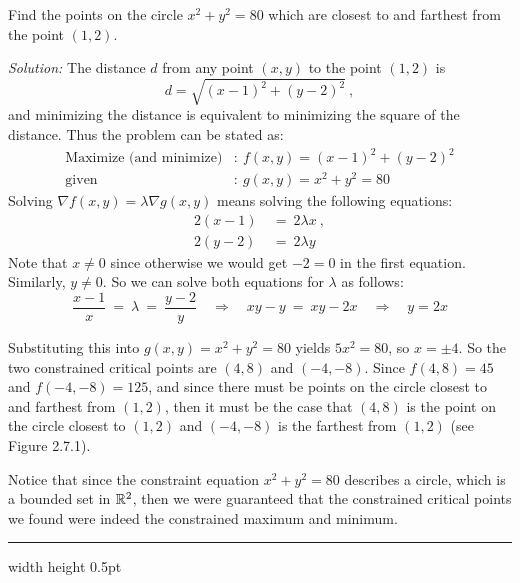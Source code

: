 \begin{exmp}
 Find the points on the circle $x^2 + y^2 = 80$ which are closest to and farthest from the point $(1,2)$.\smallskip
 \par\noindent \emph{Solution:} The distance $d$ from any point $(x,y)$ to the point $(1,2)$ is
 \begin{displaymath}
  d = \sqrt{(x-1)^2 + (y-2)^2} ~,
 \end{displaymath}
 and minimizing the distance is equivalent to minimizing the square of the distance. Thus the problem can be stated as:
 \begin{align*}
  \text{Maximize (and minimize)}&: ~ f(x,y) = (x-1)^2 + (y-2)^2\\
  \text{given}&: ~ g(x,y) = x^2 + y^2 = 80
 \end{align*}
 Solving $\nabla f(x,y) = \lambda \nabla g(x,y)$ means solving the following equations:
 \begin{align*}
  2(x-1) ~&=~ 2\lambda x ~,\\
  2(y-2) ~&=~ 2\lambda y
 \end{align*}
 Note that $x \ne 0$ since otherwise we would get $-2=0$ in the first equation. Similarly, $y \ne 0$.
 So we can solve both equations for $\lambda$ as follows:
 \begin{displaymath}
  \frac{x-1}{x} ~=~ \lambda ~=~ \frac{y-2}{y} \quad \Rightarrow \quad xy-y ~= ~xy-2x \quad \Rightarrow \quad y=2x
 \end{displaymath}

 \piccaption[]{}
 Substituting this into $g(x,y) = x^2 + y^2 = 80$ yields $5x^2=80$, so $x=\pm 4$. So the two constrained critical
 points are $(4,8)$ and $(-4,-8)$. Since $f(4,8)=45$ and $f(-4,-8)=125$, and since there must be points on the circle
 closest to and farthest from $(1,2)$, then it must be the case that $(4,8)$ is the point on the circle
 closest to $(1,2)$ and $(-4,-8)$ is the farthest from $(1,2)$ (see Figure 2.7.1).
 
 Notice that since the constraint equation $x^2 + y^2 = 80$ describes a circle, which is a bounded set in $\mathbb{R}^{2}$,
 then we were guaranteed that the constrained critical points we found were indeed the constrained maximum and
 minimum.
\end{exmp}
\hrule width \textwidth height 0.5pt
\medskip

